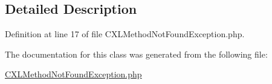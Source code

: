 \subsection{Detailed Description}


Definition at line 17 of file CXLMethodNotFoundException.php.



The documentation for this class was generated from the following file:\begin{DoxyCompactItemize}
\item 
\hyperlink{CXLMethodNotFoundException_8php}{CXLMethodNotFoundException.php}\end{DoxyCompactItemize}
